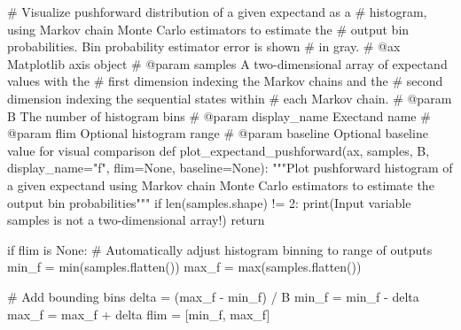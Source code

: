 \documentclass[
  letterpaper,
  DIV=11,
  numbers=noendperiod]{scrartcl}
\newenvironment{Shaded}{\begin{snugshade}}{\end{snugshade}}
\newcommand{\BuiltInTok}[1]{\textcolor[rgb]{0.00,0.23,0.31}{#1}}
\newcommand{\CommentTok}[1]{\textcolor[rgb]{0.37,0.37,0.37}{#1}}
\newcommand{\ControlFlowTok}[1]{\textcolor[rgb]{0.00,0.23,0.31}{#1}}
\newcommand{\DecValTok}[1]{\textcolor[rgb]{0.68,0.00,0.00}{#1}}
\newcommand{\KeywordTok}[1]{\textcolor[rgb]{0.00,0.23,0.31}{#1}}
\newcommand{\NormalTok}[1]{\textcolor[rgb]{0.00,0.23,0.31}{#1}}
\newcommand{\OperatorTok}[1]{\textcolor[rgb]{0.37,0.37,0.37}{#1}}
\newcommand{\StringTok}[1]{\textcolor[rgb]{0.13,0.47,0.30}{#1}}
\newcommand{\VariableTok}[1]{\textcolor[rgb]{0.07,0.07,0.07}{#1}}
\begin{document}
\begin{Shaded}
\begin{Highlighting}[]
\CommentTok{\# Visualize pushforward distribution of a given expectand as a }
\CommentTok{\# histogram, using Markov chain Monte Carlo estimators to estimate the }
\CommentTok{\# output bin probabilities.  Bin probability estimator error is shown }
\CommentTok{\# in gray.}
\CommentTok{\# @ax Matplotlib axis object}
\CommentTok{\# @param samples A two{-}dimensional array of expectand values with the }
\CommentTok{\#                first dimension indexing the Markov chains and the }
\CommentTok{\#                second dimension indexing the sequential states within }
\CommentTok{\#                each Markov chain.}
\CommentTok{\# @param B The number of histogram bins}
\CommentTok{\# @param display\_name Exectand name}
\CommentTok{\# @param flim Optional histogram range}
\CommentTok{\# @param baseline Optional baseline value for visual comparison}
\KeywordTok{def}\NormalTok{ plot\_expectand\_pushforward(ax, samples, B, display\_name}\OperatorTok{=}\StringTok{"f"}\NormalTok{, }
\NormalTok{                              flim}\OperatorTok{=}\VariableTok{None}\NormalTok{, baseline}\OperatorTok{=}\VariableTok{None}\NormalTok{):}
  \CommentTok{"""Plot pushforward histogram of a given expectand using Markov chain}
\CommentTok{     Monte Carlo estimators to estimate the output bin probabilities"""}
  \ControlFlowTok{if} \BuiltInTok{len}\NormalTok{(samples.shape) }\OperatorTok{!=} \DecValTok{2}\NormalTok{:}
    \BuiltInTok{print}\NormalTok{(}\StringTok{\textquotesingle{}Input variable \textasciigrave{}samples\textasciigrave{} is not a two{-}dimensional array!\textquotesingle{}}\NormalTok{)}
    \ControlFlowTok{return}
    
  \ControlFlowTok{if}\NormalTok{ flim }\KeywordTok{is} \VariableTok{None}\NormalTok{:}
    \CommentTok{\# Automatically adjust histogram binning to range of outputs}
\NormalTok{    min\_f }\OperatorTok{=} \BuiltInTok{min}\NormalTok{(samples.flatten())}
\NormalTok{    max\_f }\OperatorTok{=} \BuiltInTok{max}\NormalTok{(samples.flatten())}
    
    \CommentTok{\# Add bounding bins}
\NormalTok{    delta }\OperatorTok{=}\NormalTok{ (max\_f }\OperatorTok{{-}}\NormalTok{ min\_f) }\OperatorTok{/}\NormalTok{ B}
\NormalTok{    min\_f }\OperatorTok{=}\NormalTok{ min\_f }\OperatorTok{{-}}\NormalTok{ delta}
\NormalTok{    max\_f }\OperatorTok{=}\NormalTok{ max\_f }\OperatorTok{+}\NormalTok{ delta}
\NormalTok{    flim }\OperatorTok{=}\NormalTok{ [min\_f, max\_f]}
    

\end{Highlighting}
\end{Shaded}
\end{document}
